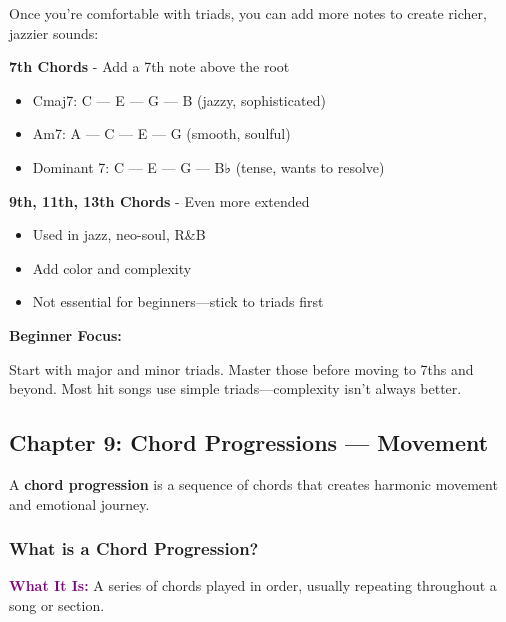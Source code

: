 \documentclass[11pt,letterpaper]{article}
\newcommand{\purple}[1]{\textcolor{purple}{\textbf{#1}}}
\begin{document}
Once you're comfortable with triads, you can add more notes to create richer, jazzier sounds:

\textbf{7th Chords} - Add a 7th note above the root
\begin{itemize}[leftmargin=*]
\item Cmaj7: C — E — G — B (jazzy, sophisticated)
\item Am7: A — C — E — G (smooth, soulful)
\item Dominant 7: C — E — G — B♭ (tense, wants to resolve)
\end{itemize}

\textbf{9th, 11th, 13th Chords} - Even more extended
\begin{itemize}[leftmargin=*]
\item Used in jazz, neo-soul, R\&B
\item Add color and complexity
\item Not essential for beginners—stick to triads first
\end{itemize}

\begin{tcolorbox}[colback=lightgray,colframe=purple,width=\textwidth,arc=3mm,boxrule=1pt]
\textbf{Beginner Focus:}

Start with major and minor triads. Master those before moving to 7ths and beyond. Most hit songs use simple triads—complexity isn't always better.
\end{tcolorbox}

\newpage


\subsection{Chapter 9: Chord Progressions — Movement}

A \textbf{chord progression} is a sequence of chords that creates harmonic movement and emotional journey.

\subsubsection{What is a Chord Progression?}

\textbf{\purple{What It Is:}} A series of chords played in order, usually repeating throughout a song or section.
\end{document}

